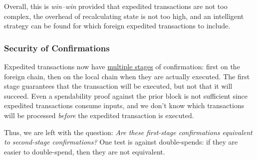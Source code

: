 Overall, this is \emph{win--win} provided that expedited transactions are not too complex, the overhead of recalculating state is not too high, and an intelligent strategy can be found for which foreign expedited transactions to include.

\subsubsection{Security of Confirmations}

Expedited transactions now have \ul{multiple stages} of confirmation: first on the foreign chain, then on the local chain when they are actually executed.
The first stage guarantees that the transaction will be executed, but not that it will succeed.
Even a spendability proof against the prior \cL block is not sufficient since expedited transactions consume inputs, and we don't know which transactions will be processed \emph{before} the expedited transaction is executed.


Thus, we are left with the question: \emph{Are these first-stage confirmations equivalent to second-stage confirmations?}
One test is against double-spends: if they are easier to double-spend, then they are not equivalent.

